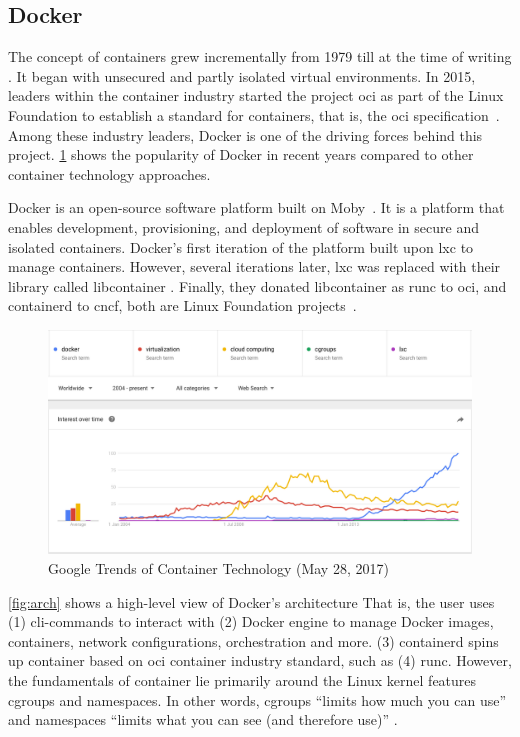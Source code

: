 \clearpage
\subsection{Docker}\label{background:docker}
The concept of containers grew incrementally from 1979 till at the time of writing \cite{TheEvolu99:online, Momentsi23:online, ABriefHi14:online, TheHisto4:online, AboutOp82:online}.
It began with unsecured and partly isolated virtual environments.
In 2015, leaders within the container industry started the project \gls{oci} as part of the Linux Foundation to establish a standard for containers, that is, the \gls{oci} specification~\cite{AboutOp82:online, Projects37:online}.
Among these industry leaders, Docker is one of the driving forces behind this project.
\cref{fig:trend} shows the popularity of Docker in recent years compared to other container technology approaches.


\skippara Docker is an open-source software platform built on Moby~\cite{mobymoby68:online, WhatisDo49:online}.
It is a platform that enables development, provisioning, and deployment of software in secure and isolated containers.
Docker's  first iteration of the platform built upon \gls{lxc} to manage containers.
However, several iterations later, \gls{lxc} was replaced with their library called libcontainer \cite{dockerli21:online}.
Finally, they donated libcontainer as runc to \gls{oci}, and containerd to \gls{cncf}, both are Linux Foundation projects~\cite{opencont67:online, containe72:online}.

\begin{figure}[h!]
    \centering
    \includegraphics[width=13cm]{figure/trend}
    \caption{Google Trends of Container Technology (May 28, 2017)}
    \label{fig:trend}
\end{figure}

\skippara \cref{fig:arch} shows a high-level view of Docker's architecture
That is, the user uses (1) \gls{cli}-commands to interact with (2) Docker engine to manage Docker images, containers, network configurations, orchestration and more.
(3) containerd spins up container based on \gls{oci} container industry standard, such as (4) runc.
However, the fundamentals of container lie primarily around the Linux kernel features cgroups and namespaces.
In other words, cgroups ``limits how much you can use'' and namespaces ``limits what you can see (and therefore use)'' \cite{Anatomyo69:online}.

